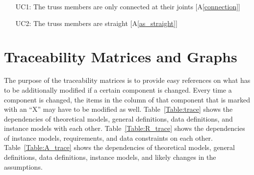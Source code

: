 \documentclass[12pt]{article}
\newcommand{\aref}[1]{A\ref{#1}}
\begin{document}
\noindent \begin{itemize}

\item[UC1\label{UC_connection}:] The truss members are only connected at their joints [\aref{connection}]
\item[UC2\label{UC_straight}:] The truss members are straight [\aref{as_straight}]
\end{itemize}

\section{Traceability Matrices and Graphs}

The purpose of the traceability matrices is to provide easy references on what
has to be additionally modified if a certain component is changed.  Every time a
component is changed, the items in the column of that component that is marked
with an ``X'' may have to be modified as well.  Table~\ref{Table:trace} shows the
dependencies of theoretical models, general definitions, data definitions, and
instance models with each other. Table~\ref{Table:R_trace} shows the
dependencies of instance models, requirements, and data constraints on each
other. Table~\ref{Table:A_trace} shows the dependencies of theoretical models,
general definitions, data definitions, instance models, and likely changes in
the assumptions.
\end{document}
